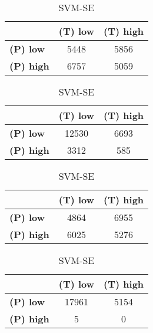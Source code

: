 \begin{table}[htbp]
\centering
\begin{minipage}{.3\textwidth}
\tiny
\caption*{SVM-AP}
\begin{tabular}{|l|c|c|}
\hline
					& \textbf{(T) low}	& \textbf{(T) high}	\\ \hline
\textbf{(P) low}	& 5448				& 5856				\\ \hline
\textbf{(P) high}	& 6757				& 5059				\\ \hline
\end{tabular}
\end{minipage}\hfill
\begin{minipage}{.3\textwidth}
\tiny
\caption*{SVM-AT}
\begin{tabular}{|l|c|c|}
\hline
					& \textbf{(T) low}	& \textbf{(T) high}	\\ \hline
\textbf{(P) low}	& 12530				& 6693				\\ \hline
\textbf{(P) high}	& 3312				& 585				\\ \hline
\end{tabular}
\end{minipage}\hfill
\begin{minipage}{.3\textwidth}
\tiny
\caption*{SVM-PL}
\begin{tabular}{|l|c|c|}
\hline
					& \textbf{(T) low}	& \textbf{(T) high}	\\ \hline
\textbf{(P) low}	& 4864				& 6955				\\ \hline
\textbf{(P) high}	& 6025				& 5276				\\ \hline
\end{tabular}
\end{minipage}\hfill
\begin{minipage}{.3\textwidth}
\tiny
\caption*{SVM-SE}
\begin{tabular}{|l|c|c|}
\hline
					& \textbf{(T) low}	& \textbf{(T) high}	\\ \hline
\textbf{(P) low}	& 17961				& 5154				\\ \hline
\textbf{(P) high}	& 5					& 0					\\ \hline
\end{tabular}
\end{minipage}\hfill
\end{table}
